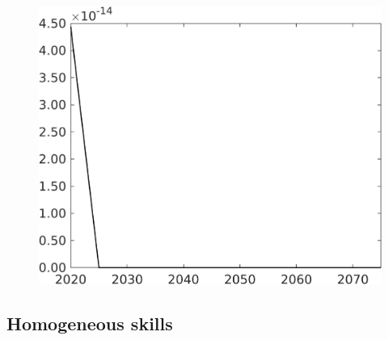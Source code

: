 \documentclass[12pt]{article}
\begin{document}
\begin{figure}[h!!]
\begin{minipage}[]{0.32\textwidth}
	\end{minipage}	
	\begin{minipage}[]{0.32\textwidth}
		\includegraphics[width=1\textwidth]{../../codding_model/own_basedOnFried/optimalPol_010922_revision/figures/all_13Sept22/CompTaufPER_bytaul_Equlab_Reg0_F_spillover0_nsk0_xgr0_knspil0_sep0_LFlimit1_emsbase0_countec0_GovRev0_etaa0.79_lgd0.png}
	\end{minipage}	
\end{figure}
\clearpage \newpage
\subsection{Homogeneous skills}
\end{document}
